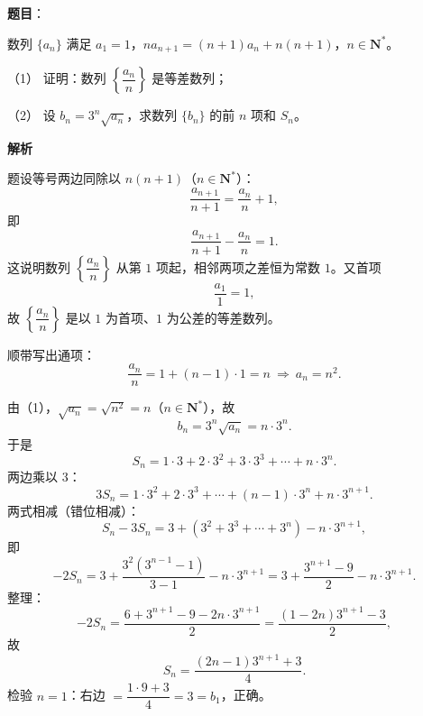 \begin{answer}

\textbf{题目}：

数列 $\{a_n\}$ 满足 $a_1=1$，$na_{n+1}=(n+1)a_n+n(n+1)$，$n\in\mathbf N^*$。

（1） 证明：数列 $\left\{\dfrac{a_n}n\right\}$ 是等差数列；

（2） 设 $b_n=3^n\sqrt{a_n}$，求数列 $\{b_n\}$ 的前 $n$ 项和 $S_n$。

\textbf{解析}


题设等号两边同除以 $n(n+1)$（$n\in\mathbf N^*$）：
\nopagebreak[4]
\[\frac{a_{n+1}}{n+1}=\frac{a_n}{n}+1,\]
即
\nopagebreak[4]
\[\frac{a_{n+1}}{n+1}-\frac{a_n}{n}=1 .\]
这说明数列 $\left\{\dfrac{a_n}n\right\}$ 从第 $1$ 项起，相邻两项之差恒为常数 $1$。又首项
\nopagebreak[4]
\[\frac{a_1}1=1,\]
故 $\left\{\dfrac{a_n}n\right\}$ 是以 $1$ 为首项、$1$ 为公差的等差数列。

顺带写出通项：
\nopagebreak[4]
\[\frac{a_n}{n}=1+(n-1)\cdot1=n\ \Longrightarrow\ a_n=n^2 .\]


由（1），$\sqrt{a_n}=\sqrt{n^2}=n$（$n\in\mathbf N^*$），故
\nopagebreak[4]
\[b_n=3^n\sqrt{a_n}=n\cdot3^n .\]
于是
\nopagebreak[4]
\[S_n=1\cdot3+2\cdot3^2+3\cdot3^3+\cdots+n\cdot3^n .\]
两边乘以 $3$：
\nopagebreak[4]
\[3S_n=1\cdot3^2+2\cdot3^3+\cdots+(n-1)\cdot3^n+n\cdot3^{n+1}.\]
两式相减（错位相减）：
\nopagebreak[4]
\[S_n-3S_n=3+\left(3^2+3^3+\cdots+3^n\right)-n\cdot3^{n+1},\]
即
\nopagebreak[4]
\[-2S_n=3+\frac{3^2\left(3^{n-1}-1\right)}{3-1}-n\cdot3^{n+1}
=3+\frac{3^{n+1}-9}{2}-n\cdot3^{n+1}.\]
整理：
\nopagebreak[4]
\[-2S_n=\frac{6+3^{n+1}-9-2n\cdot3^{n+1}}2
=\frac{(1-2n)3^{n+1}-3}2,\]
故
\nopagebreak[4]
\[S_n=\frac{(2n-1)3^{n+1}+3}4 .\]
检验 $n=1$：右边 $=\dfrac{1\cdot9+3}4=3=b_1$，正确。



\end{answer}
